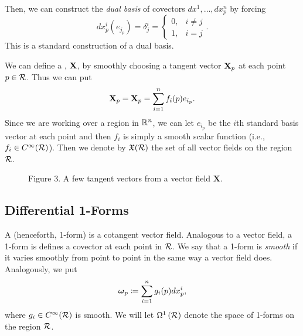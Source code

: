 \noindent Then, we can construct the \emph{dual basis} of covectors $dx^1,\dots,dx^n_p$ by forcing
\[
dx^i_p\left(e_{j_p}\right)=\delta^i_j = 
\begin{cases}
0, & i\neq j\\
1, & i=j
\end{cases}.
\]
This is a standard construction of a dual basis.

We can define a , $\mathbf{X}$, by smoothly choosing a tangent vector $\mathbf{X}_p$ at each point $p\in \mathcal{R}$.  Thus we can put
\[
\mathbf{X}_p = \mathbf{X}_p= \sum_{i=1}^n f_i(p)e_{i_p}.
\]
Since we are working over a region in $\mathbb{R}^n$, we can let $e_{i_p}$ be the $i$th standard basis vector at each point and then $f_i$ is simply a smooth scalar function (i.e., $f_i\in C^\infty(\mathcal{R})$). Then we denote by $\mathfrak{X}(\mathcal{R})$ the set of all vector fields on the region $\mathcal{R}$. 

        \begin{figure}[ht]
        \centering
        \caption{Figure 3. A few tangent vectors from a vector field $\mathbf{X}$.}
        \end{figure}

\subsection{Differential 1-Forms}

A  (henceforth, 1-form) is a cotangent vector field. Analogous to a vector field, a 1-form is defines a covector at each point in $\mathcal{R}$. We say that a 1-form is \emph{smooth} if it varies smoothly from point to point in the same way a vector field does. Analogously, we put
\[
\boldsymbol{\omega}_p \coloneqq \sum_{i=1}^n g_i(p)dx^i_p,
\]
where $g_i\in C^\infty(\mathcal{R})$ is smooth. We will let $\Omega^1\left(\mathcal{R}\right)$ denote the space of 1-forms on the region $\mathcal{R}$.

